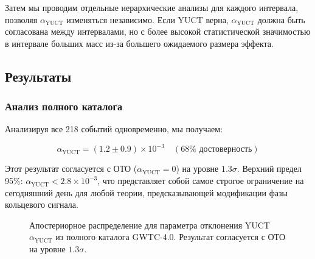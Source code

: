 \documentclass[12pt,a4paper]{article}
\theoremstyle{remark}
\begin{document}
	Затем мы проводим отдельные иерархические анализы для каждого интервала, позволяя $\alpha_{\text{YUCT}}$ изменяться независимо. Если YUCT верна, $\alpha_{\text{YUCT}}$ должна быть согласована между интервалами, но с более высокой статистической значимостью в интервале больших масс из-за большего ожидаемого размера эффекта.
	
	\subsection{Результаты}
	
	\subsubsection{Анализ полного каталога}
	
	Анализируя все 218 событий одновременно, мы получаем:
	
	\begin{equation}
		\alpha_{\text{YUCT}} = (1.2 \pm 0.9) \times 10^{-3} \quad (68\% \text{ достоверность})
		\label{eq:alpha-result}
	\end{equation}
	
	Этот результат согласуется с ОТО ($\alpha_{\text{YUCT}} = 0$) на уровне $1.3\sigma$. Верхний предел 95\%: $\alpha_{\text{YUCT}} < 2.8 \times 10^{-3}$, что представляет собой самое строгое ограничение на сегодняшний день для любой теории, предсказывающей модификации фазы кольцевого сигнала.
	
	\begin{figure}[htbp]
		\centering
		\caption{Апостериорное распределение для параметра отклонения YUCT $\alpha_{\text{YUCT}}$ из полного каталога GWTC-4.0. Результат согласуется с ОТО на уровне $1.3\sigma$.}
		\label{fig:alpha-posterior}
	\end{figure}
	
\end{document}
